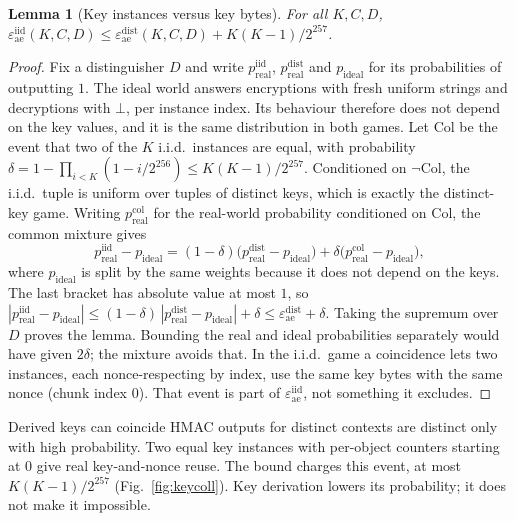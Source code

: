 \documentclass[pdflatex,sn-mathphys-num]{sn-jnl}
\theoremstyle{plain}
\newtheorem{lemma}[theorem]{Lemma}
\theoremstyle{definition}
\begin{document}
\begin{lemma}[Key instances versus key bytes]\label{lem:keycoll}
For all $K,C,D$, $\varepsilon^{\mathrm{iid}}_{\mathrm{ae}}(K,C,D)\le\varepsilon^{\mathrm{dist}}_{\mathrm{ae}}(K,C,D)+K(K-1)/2^{257}$.
\end{lemma}
\begin{proof}
Fix a distinguisher $D$ and write $p^{\mathrm{iid}}_{\mathrm{real}}$, $p^{\mathrm{dist}}_{\mathrm{real}}$ and $p_{\mathrm{ideal}}$ for its probabilities of outputting $1$. The ideal world answers encryptions with fresh uniform strings and decryptions with $\bot$, per instance index. Its behaviour therefore does not depend on the key values, and it is the same distribution in both games. Let $\mathrm{Col}$ be the event that two of the $K$ i.i.d.\ instances are equal, with probability $\delta=1-\prod_{i<K}(1-i/2^{256})\le K(K-1)/2^{257}$. Conditioned on $\neg\mathrm{Col}$, the i.i.d.\ tuple is uniform over tuples of distinct keys, which is exactly the distinct-key game. Writing $p^{\mathrm{col}}_{\mathrm{real}}$ for the real-world probability conditioned on $\mathrm{Col}$, the common mixture gives
\[
 p^{\mathrm{iid}}_{\mathrm{real}}-p_{\mathrm{ideal}}=(1-\delta)\big(p^{\mathrm{dist}}_{\mathrm{real}}-p_{\mathrm{ideal}}\big)+\delta\big(p^{\mathrm{col}}_{\mathrm{real}}-p_{\mathrm{ideal}}\big),
\]
where $p_{\mathrm{ideal}}$ is split by the same weights because it does not depend on the keys. The last bracket has absolute value at most $1$, so $|p^{\mathrm{iid}}_{\mathrm{real}}-p_{\mathrm{ideal}}|\le(1-\delta)\,|p^{\mathrm{dist}}_{\mathrm{real}}-p_{\mathrm{ideal}}|+\delta\le\varepsilon^{\mathrm{dist}}_{\mathrm{ae}}+\delta$. Taking the supremum over $D$ proves the lemma. Bounding the real and ideal probabilities separately would have given $2\delta$; the mixture avoids that. In the i.i.d.\ game a coincidence lets two instances, each nonce-respecting by index, use the same key bytes with the same nonce (chunk index $0$). That event is part of $\varepsilon^{\mathrm{iid}}_{\mathrm{ae}}$, not something it excludes.
\end{proof}

\begin{warnbox}{Derived keys can coincide}
HMAC outputs for distinct contexts are distinct only with high probability. Two equal key instances with per-object counters starting at $0$ give real key-and-nonce reuse. The bound charges this event, at most $K(K-1)/2^{257}$ (Fig.~\ref{fig:keycoll}). Key derivation lowers its probability; it does not make it impossible.
\end{warnbox}
\end{document}
